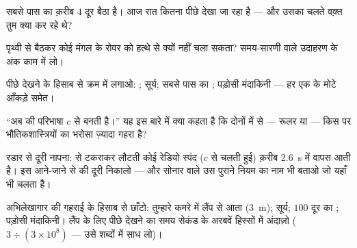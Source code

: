 \begin{exercise}[$\star$]\label{exo:g8:speed-of-light:5}
सबसे पास का  क़रीब $4$  दूर बैठा है। आज रात कितना पीछे
देखा जा रहा है --- और उसका  चलते वक़्त तुम क्या कर रहे थे?
\end{exercise}

\begin{exercise}[$\star$]\label{exo:g8:speed-of-light:6}
पृथ्वी से बैठकर कोई मंगल के रोवर को हत्थे से क्यों नहीं चला सकता?
समय-सारणी वाले उदाहरण के अंक काम में लो।
\end{exercise}

\begin{exercise}[$\star$]\label{exo:g8:speed-of-light:7}
पीछे देखने के हिसाब से क्रम में लगाओ: ; सूर्य; सबसे पास का
; पड़ोसी मंदाकिनी --- हर एक के मोटे आँकड़े समेत।
\end{exercise}

\begin{exercise}[$\star$]\label{exo:g8:speed-of-light:8}
``अब  की परिभाषा $c$ से बनती है।'' यह इस बारे में क्या कहता है कि
दोनों में से --- रूलर या  --- किस पर भौतिकशास्त्रियों का भरोसा
ज़्यादा गहरा है?
\end{exercise}

\begin{exercise}[$\star\star$]\label{exo:g8:speed-of-light:9}
रडार से दूरी नापना:  से टकराकर लौटती कोई रेडियो स्पंद ($c$ से
चलती हुई) क़रीब \qty{2.6}{s} में वापस आती है। इस आने-जाने से 
की दूरी निकालो --- और सोनार वाले उस पुराने नियम का नाम भी बताओ जो
यहाँ भी चलता है।
\end{exercise}

\begin{exercise}[$\star\star$]\label{exo:g8:speed-of-light:10}
अभिलेखागार की गहराई के हिसाब से छाँटो: तुम्हारे कमरे में लैंप से आता
 (\qty{3}{m}); सूर्य; $100$  दूर का ; पड़ोसी
मंदाकिनी। लैंप के लिए पीछे देखने का समय सेकंड के अरबवें हिस्सों में
अंदाज़ो ($3 \div (3 \times 10^{8})$ --- उसे शब्दों में साध लो)।
\end{exercise}

